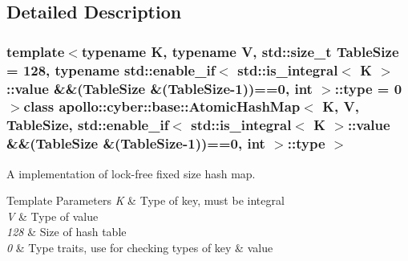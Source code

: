\subsection{Detailed Description}
\subsubsection*{template$<$typename K, typename V, std\-::size\-\_\-t Table\-Size = 128, typename std\-::enable\-\_\-if$<$ std\-::is\-\_\-integral$<$ K $>$\-::value \&\&(\-Table\-Size \&(\-Table\-Size-\/1))==0, int $>$\-::type = 0$>$class apollo\-::cyber\-::base\-::\-Atomic\-Hash\-Map$<$ K, V, Table\-Size, std\-::enable\-\_\-if$<$ std\-::is\-\_\-integral$<$ K $>$\-::value \&\&(\-Table\-Size \&(\-Table\-Size-\/1))==0, int $>$\-::type $>$}

A implementation of lock-\/free fixed size hash map. 


\begin{DoxyTemplParams}{Template Parameters}
{\em K} & Type of key, must be integral \\
\hline
{\em V} & Type of value \\
\hline
{\em 128} & Size of hash table \\
\hline
{\em 0} & Type traits, use for checking types of key \& value \\
\hline
\end{DoxyTemplParams}


